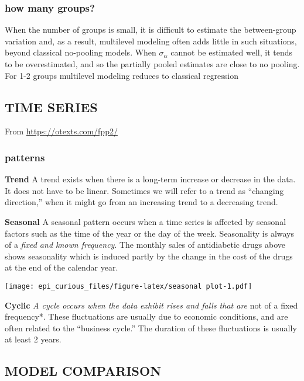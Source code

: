 \documentclass[
]{article}
\begin{document}
\hypertarget{how-many-groups}{%
\subsubsection{how many groups?}\label{how-many-groups}}

When the number of groups is small, it is difficult to estimate the
between-group variation and, as a result, multilevel modeling often adds
little in such situations, beyond classical no-pooling models. When
\(\sigma_{\alpha}\) cannot be estimated well, it tends to be
overestimated, and so the partially pooled estimates are close to no
pooling. For 1-2 groups multilevel modeling reduces to classical
regression

\hypertarget{time-series}{%
\subsection{\texorpdfstring{\textbf{TIME
SERIES}}{TIME SERIES}}\label{time-series}}

From \url{https://otexts.com/fpp2/}

\hypertarget{patterns}{%
\subsubsection{patterns}\label{patterns}}

\textbf{Trend} A trend exists when there is a long-term increase or
decrease in the data. It does not have to be linear. Sometimes we will
refer to a trend as ``changing direction,'' when it might go from an
increasing trend to a decreasing trend.

\textbf{Seasonal} A seasonal pattern occurs when a time series is
affected by seasonal factors such as the time of the year or the day of
the week. Seasonality is always of a \emph{fixed and known frequency}.
The monthly sales of antidiabetic drugs above shows seasonality which is
induced partly by the change in the cost of the drugs at the end of the
calendar year.

\texttt{[image: epi\_curious\_files/figure-latex/seasonal plot-1.pdf]}

\textbf{Cyclic}\emph{ A cycle occurs when the data exhibit rises and
falls that are }not of a fixed frequency*. These fluctuations are
usually due to economic conditions, and are often related to the
``business cycle.'' The duration of these fluctuations is usually at
least 2 years.

\hypertarget{model-comparison}{%
\subsection{\texorpdfstring{\textbf{MODEL
COMPARISON}}{MODEL COMPARISON}}\label{model-comparison}}
\end{document}
